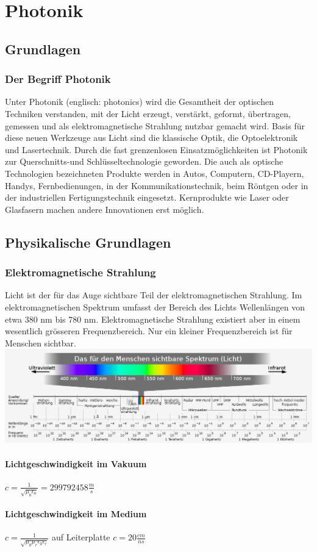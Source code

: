 \section {Photonik}
\subsection {Grundlagen}
\subsubsection {Der Begriff Photonik}
Unter Photonik (englisch: photonics) wird die Gesamtheit der optischen Techniken verstanden, mit der Licht erzeugt, verstärkt, geformt, übertragen, gemessen und als elektromagnetische Strahlung nutzbar gemacht wird. Basis für diese neuen Werkzeuge aus Licht sind die klassische Optik, die Optoelektronik und Lasertechnik. Durch die fast grenzenlosen Einsatzmöglichkeiten ist Photonik zur Querschnitts-und Schlüsseltechnologie geworden. Die auch als optische Technologien bezeichneten Produkte werden in Autos, Computern, CD-Playern, Handys, Fernbedienungen, in der Kommunikationstechnik, beim Röntgen oder in der industriellen Fertigungstechnik eingesetzt. Kernprodukte wie Laser oder Glasfasern machen andere Innovationen erst möglich.

\subsection {Physikalische Grundlagen}
\subsubsection {Elektromagnetische Strahlung}
Licht ist der für das Auge sichtbare Teil der elektromagnetischen Strahlung. Im elektromagnetischen Spektrum umfasst der Bereich des Lichts Wellenlängen von etwa 380 nm bis 780 nm. Elektromagnetische Strahlung existiert aber in einem wesentlich grösseren Frequenzbereich. Nur ein kleiner Frequenzbereich ist für Menschen sichtbar.
\includegraphics[width=\textwidth]{images/strahlung}

\begin{multicols}{2}
\paragraph {Lichtgeschwindigkeit im Vakuum}
$c = \frac {1}{\sqrt{\mu_0 \epsilon_0}} = 299792458 \frac{m}{s}$

\paragraph {Lichtgeschwindigkeit im Medium}
$c = \frac {1}{\sqrt{\mu_0 \mu_r \epsilon_0 \epsilon_r}}$ auf Leiterplatte $c = 20 \frac{cm}{ns}$ 
\end{multicols}

